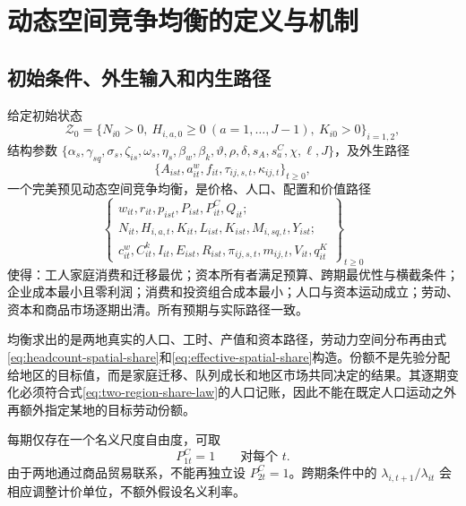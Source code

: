 \documentclass[UTF8,a4paper,zihao=-4,fontset=windows]{ctexart}
\numberwithin{equation}{section}
\newcommand{\pc}{P^{C}}
\newcommand{\invp}{Q}
\begin{document}
\section{动态空间竞争均衡的定义与机制}
\label{sec:equilibrium}

\subsection{初始条件、外生输入和内生路径}
给定初始状态
\begin{equation}
 \mathcal Z_0=\{N_{i0}>0,\ H_{i,a,0}\geq0\ (a=1,\ldots,J-1),\ K_{i0}>0\}_{i=1,2},
\end{equation}
结构参数 $\{\alpha_s,\gamma_{sq},\sigma_s,\zeta_{is},\omega_s,\eta_s,
 \beta_w,\beta_k,\vartheta,\rho,\delta,s_A,s^C_a,\chi,\ell,J\}$，及外生路径
\begin{equation}
 \{A_{ist},a^w_{it},f_{it},\tau_{ij,s,t},\kappa_{ij,t}\}_{t\geq0},
\end{equation}
一个完美预见动态空间竞争均衡，是价格、人口、配置和价值路径
\begin{equation}
 \left\{\begin{array}{c}
 w_{it},r_{it},p_{ist},P_{ist},\pc_{it},\invp_{it};\\
 N_{it},H_{i,a,t},K_{it},L_{ist},K_{ist},M_{i,sq,t},Y_{ist};\\
 c^w_{it},C^k_{it},I_{it},E_{ist},R_{ist},\pi_{ij,s,t},m_{ij,t},V_{it},q^K_{it}
 \end{array}\right\}_{t\geq0}
\end{equation}
使得：工人家庭消费和迁移最优；资本所有者满足预算、跨期最优性与横截条件；企业成本最小且零利润；消费和投资组合成本最小；人口与资本运动成立；劳动、资本和商品市场逐期出清。所有预期与实际路径一致。

均衡求出的是两地真实的人口、工时、产值和资本路径，劳动力空间分布再由式\eqref{eq:headcount-spatial-share}和\eqref{eq:effective-spatial-share}构造。份额不是先验分配给地区的目标值，而是家庭迁移、队列成长和地区市场共同决定的结果。其逐期变化必须符合式\eqref{eq:two-region-share-law}的人口记账，因此不能在既定人口运动之外再额外指定某地的目标劳动份额。

每期仅存在一个名义尺度自由度，可取
\begin{equation}
 \pc_{1t}=1\qquad\text{对每个 }t.
 \label{eq:numeraire}
\end{equation}
由于两地通过商品贸易联系，不能再独立设 $\pc_{2t}=1$。跨期条件中的 $\lambda_{i,t+1}/\lambda_{it}$ 会相应调整计价单位，不额外假设名义利率。
\end{document}
